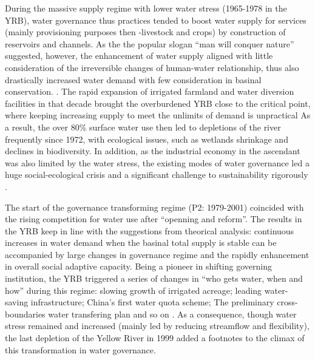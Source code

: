 During the massive supply regime with lower water stress (1965-1978 in the YRB), water governance thus practices tended to boost water supply for services (mainly provisioning purposes then -livestock and crops) by construction of reservoirs and channels.
As the the popular slogan ``man will conquer nature'' suggested, however, the enhancement of water supply aligned with little consideration of the irreversible changes of human-water relationship, thus also drastically increased water demand with few consideration in basinal conservation. 
\cite{zhouDecelerationChinahuman2020}.
The rapid expansion of irrigated farmland and water diversion facilities in that decade brought the overburdened YRB close to the critical point, where keeping increasing supply to meet the unlimits of demand is unpractical
As a result, the over 80\% surface water use then led to depletions of the river frequently since 1972, with ecological issues, such as wetlands shrinkage and declines in biodiversity. 
In addition, as the industrial economy in the ascendant was also limited by the water stress, the existing modes of water governance led a huge social-ecological crisis and a significant challenge to sustainability rigorously
\cite{wohlfartRiverBasinCourse2016}.

The start of the governance transforming regime (P2: 1979-2001) coincided with the rising competition for water use after ``openning and reform''.
The results in the YRB keep in line with the suggestions from theorical analysis: continuous increases in water demand when the basinal total supply is stable can be accompanied by large changes in governance regime and the rapidly enhancement in overall social adaptive capacity.
Being a pioneer in shifting governing institution, the YRB triggered a series of changes in ``who gets water, when and how'' during this regime: slowing growth of irrigated acreage; leading water-saving infrastructure; China's first water quota scheme; The preliminary cross-boundaries water transfering plan and so on
\cite{wangThirtyYearsYellow2018}.
As a consequence, though water stress remained and increased (mainly led by reducing streamflow and flexibility), the last depletion of the Yellow River in 1999 added a footnotes to the climax of this transformation in water governance.

